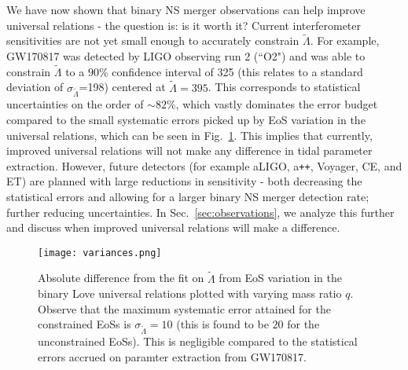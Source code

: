 \documentclass[prd,twocolumn,nofootinbib,superscriptaddress,amsmath,amssymb]{revtex4-1}
\begin{document}
We have now shown that binary NS merger observations can help improve universal relations - the question is: is it worth it?
Current interferometer sensitivities are not yet small enough to accurately constrain $\tilde{\Lambda}$.
For example, GW170817 was detected by LIGO observing run 2 (``O2") and was able to constrain $\tilde{\Lambda}$ to a $90\%$ confidence interval of 325 (this relates to a standard deviation of $\sigma_{\tilde{\Lambda}}$=198) centered at $\tilde{\Lambda}=395$.
This corresponds to statistical uncertainties on the order of $\sim 82\%$, which vastly dominates the error budget compared to the small systematic errors picked up by EoS variation in the universal relations, which can be seen in Fig.~\ref{fig:variances}.
This implies that currently, improved universal relations will not make any difference in tidal parameter extraction.
However, future detectors (for example aLIGO, a\texttt{++}, Voyager, CE, and ET) are planned with large reductions in sensitivity - both decreasing the statistical errors and allowing for a larger binary NS merger detection rate; further reducing uncertainties.
In Sec.~\ref{sec:observations}, we analyze this further and discuss when improved universal relations will make a difference.
\begin{figure}
\begin{center} 
\texttt{[image: variances.png]}
\end{center}
\caption{
Absolute difference from the fit on $\tilde{\Lambda}$ from EoS variation in the binary Love universal relations plotted with varying mass ratio $q$.
Observe that the maximum systematic error attained for the constrained EoSs is $\sigma_{\tilde{\Lambda}}=10$ (this is found to be $20$ for the unconstrained EoSs).
This is negligible compared to the statistical errors accrued on paramter extraction from GW170817.
}
\label{fig:variances}
\end{figure}

\end{document}
